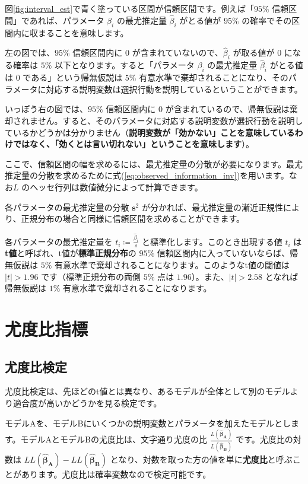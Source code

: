 図\ref{fig:interval_est}で青く塗っている区間が信頼区間です。例えば「$95\%$ 信頼区間」であれば、パラメータ $\beta_i$ の最尤推定量 $\hat\beta_i$ がとる値が $95\%$ の確率でその区間内に収まることを意味します。

左の図では、$95\%$ 信頼区間内に $0$ が含まれていないので、$\hat\beta_i$ が取る値が $0$ になる確率は $5\%$ 以下となります。すると「パラメータ $\beta_i$ の最尤推定量 $\hat\beta_i$ がとる値は $0$ である」という帰無仮説は $5\%$ 有意水準で棄却されることになり、そのパラメータに対応する説明変数は選択行動を説明しているということができます。

いっぽう右の図では、$95\%$ 信頼区間内に $0$ が含まれているので、帰無仮説は棄却されません。すると、そのパラメータに対応する説明変数が選択行動を説明しているかどうかは分かりません（\textbf{説明変数が「効かない」ことを意味しているわけではなく、「効くとは言い切れない」ということを意味します}）。

ここで、信頼区間の幅を求めるには、最尤推定量の分散が必要になります。最尤推定量の分散を求めるために式(\ref{eq:observed_information_inv})を用います。なお$L$ のヘッセ行列は数値微分によって計算できます。

各パラメータの最尤推定量の分散 $\bm s^2$ が分かれば、最尤推定量の漸近正規性により、正規分布の場合と同様に信頼区間を求めることができます。

各パラメータの最尤推定量を $t_i\coloneq\frac{\hat\beta_i}{s}$ と標準化します。このとき出現する値 $t_i$ は\textbf{t値}と呼ばれ、t値が\textbf{標準正規分布}の $95\%$ 信頼区間内に入っていないならば、帰無仮説は $5\%$ 有意水準で棄却されることになります。このようなt値の閾値は $|t|>1.96$ です（標準正規分布の両側 $5\%$ 点は $1.96$）。また、$|t|>2.58$ となれば帰無仮説は $1\%$ 有意水準で棄却されることになります。

\section{尤度比指標}\label{sec:likelihood_ratio}

\subsection{尤度比検定}

尤度比検定は、先ほどのt値とは異なり、あるモデルが全体として別のモデルより適合度が高いかどうかを見る検定です。

モデルAを、モデルBにいくつかの説明変数とパラメータを加えたモデルとします。モデルAとモデルBの尤度比は、文字通り尤度の比 $\frac{L(\bm{\hat\beta_A})}{L(\bm{\hat\beta_B})}$ です。尤度比の対数は $LL(\bm{\hat\beta_A})-LL(\bm{\hat\beta_B})$ となり、対数を取った方の値を単に\textbf{尤度比}と呼ぶことがあります。尤度比は確率変数なので検定可能です。

